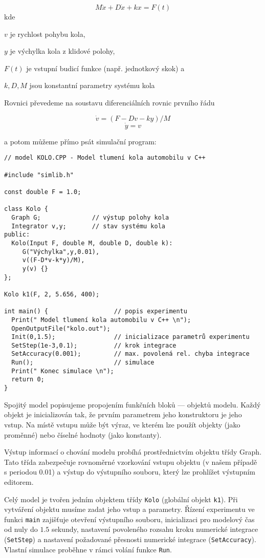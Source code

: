 \documentclass[a4paper]{article}
\begin{document}
           $$ M \ddot{x} + D \dot{x} + k x = F(t) $$
\noindent
kde

 $v$      je rychlost pohybu kola,
 
 $y$      je výchylka kola z klidové polohy,
 
 $F(t)$   je vstupní budicí funkce (např. jednotkový skok) a
 
 $k,D,M$  jsou konstantní parametry systému kola

\noindent
Rovnici převedeme na soustavu diferenciálních rovnic prvního řádu

           $$ \dot{v} = (F - D v - k y) / M $$
           $$ \dot{y} = v $$

a potom můžeme přímo psát simulační program:

{\small
\begin{verbatim}
// model KOLO.CPP - Model tlumení kola automobilu v C++

#include "simlib.h"

const double F = 1.0;

class Kolo {
  Graph G;              // výstup polohy kola
  Integrator v,y;       // stav systému kola
public:
  Kolo(Input F, double M, double D, double k):
     G("Výchylka",y,0.01),
     v((F-D*v-k*y)/M),
     y(v) {}
};

Kolo k1(F, 2, 5.656, 400);

int main() {                  // popis experimentu
  Print(" Model tlumení kola automobilu v C++ \n");
  OpenOutputFile("kolo.out");
  Init(0,1.5);                // inicializace parametrů experimentu
  SetStep(1e-3,0.1);          // krok integrace
  SetAccuracy(0.001);         // max. povolená rel. chyba integrace
  Run();                      // simulace
  Print(" Konec simulace \n");
  return 0;
}
\end{verbatim}
}

Spojitý model popisujeme propojením funkčních bloků --- objektů
modelu. Každý objekt je inicializován tak, že prvním parametrem
jeho konstruktoru je jeho vstup. Na místě vstupu může být výraz,
ve kterém lze použít objekty (jako proměnné) nebo číselné
hodnoty (jako konstanty).

Výstup informací o chování modelu probíhá prostřednictvím
objektu třídy Graph. Tato třída zabezpečuje rovnoměrné
vzorkování vstupu objektu (v našem případě s periodou 0.01)
a výstup do výstupního souboru, který lze prohlížet výstupním
editorem.

Celý model je tvořen jedním objektem třídy \verb|Kolo| (globální objekt
\verb|k1|). Při vytváření objektu musíme zadat jeho vstup a parametry. Řízení
experimentu ve funkci \verb|main| zajišťuje otevření výstupního souboru,
inicializaci pro modelový čas od nuly do $1.5$ sekundy, nastavení povoleného
rozsahu kroku numerické integrace (\verb|SetStep|) a nastavení požadované
přesnosti numerické integrace (\verb|SetAccuracy|). Vlastní simulace proběhne
v rámci volání funkce \verb|Run|.
\end{document}
